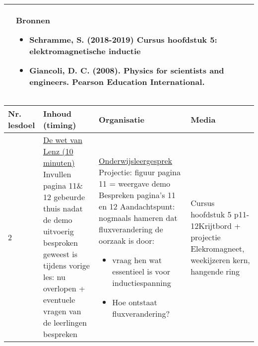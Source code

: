 \begin{landscape}
\begin{tabularx}{1.56\textwidth}{|p{}|X|}
		\\ \cline{2-2}
		  & \textbf{Bronnen}\begin{itemize}
		  	\item Schramme, S. (2018-2019) Cursus hoofdstuk 5: elektromagnetische inductie
		  	\item Giancoli, D. C. (2008). Physics for scientists and engineers. Pearson Education International.
		  \end{itemize}\\ \hline
	\end{tabularx}


\newpage
	


\begin{tabularx}{1.56\textwidth}{|p{1.5cm}|p{8cm}|X|p{4cm}|}
	\hline
	\textbf{Nr. lesdoel } & \textbf{Inhoud (timing)}  & \textbf{Organisatie } & \textbf{Media } \\ \hline
	2\newline\newline 3&\underline{De wet van Lenz (10 minuten)}\newline
	Invullen pagina 11\& 12 gebeurde thuis nadat de demo uitvoerig besproken geweest is tijdens vorige les: nu overlopen + eventuele vragen van de leerlingen bespreken
	&  \underline{Onderwijsleergesprek}\newline 
	Projectie: figuur pagina 11 = weergave demo\newline
	Bespreken pagina's 11 en 12\newline
	Aandachtspunt: nogmaals hameren dat fluxverandering de oorzaak is door:
	\begin{itemize}
		\item vraag hen wat essentieel is voor inductiespanning
		\item Hoe ontstaat fluxverandering?
	\end{itemize}
	&   Cursus hoofdstuk 5 p11-12\newline\newline Krijtbord + projectie \newline\newline Elekromagneet, weekijzeren kern, hangende ring
	\\ \hline
\end{tabularx}\vspace{5mm}


\end{landscape}
